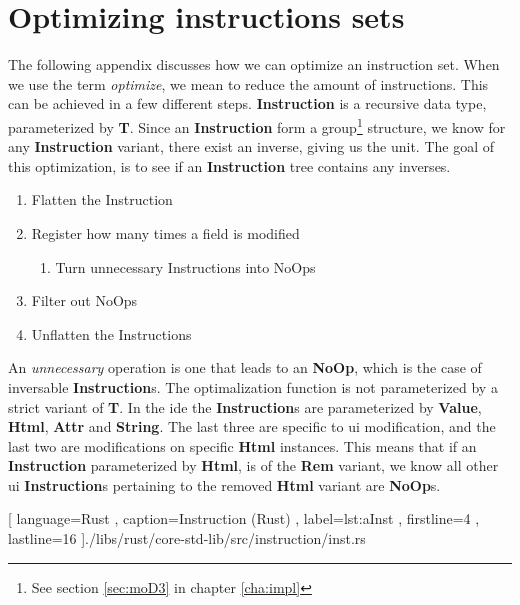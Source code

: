 \chapter{Optimizing instructions sets} \label{app:a}

The following appendix discusses how we can optimize an instruction set. When we
use the term \textit{optimize}, we mean to reduce the amount of instructions.
This can be achieved in a few different steps. \textbf{Instruction} is a
recursive data type, parameterized by \textbf{T}. Since an \textbf{Instruction}
form a group\footnote{See section \ref{sec:moD3} in chapter \ref{cha:impl}}
structure, we know for any \textbf{Instruction} variant, there exist an inverse,
giving us the unit. The goal of this optimization, is to see if an
\textbf{Instruction} tree contains any inverses.

\begin{enumerate}
  \item Flatten the Instruction
  \item Register how many times a field is modified
    \begin{enumerate}
      \item Turn unnecessary Instructions into NoOps
    \end{enumerate}
  \item Filter out NoOps
  \item Unflatten the Instructions
\end{enumerate}

An \textit{unnecessary} operation is one that leads to an \textbf{NoOp}, which
is the case of inversable \textbf{Instruction}s. The optimalization function
is not parameterized by a strict variant of \textbf{T}. In the \gls*{ide} the
\textbf{Instruction}s are parameterized by \textbf{Value}, \textbf{Html},
\textbf{Attr} and \textbf{String}. The last three are specific to \gls*{ui}
modification, and the last two are modifications on specific \textbf{Html}
instances. This means that if an \textbf{Instruction} parameterized by
\textbf{Html}, is of the \textbf{Rem} variant, we know all other \gls*{ui}
\textbf{Instruction}s pertaining to the removed \textbf{Html} variant are
\textbf{NoOp}s.

\begin{code}[H]
  
   [ language=Rust
   , caption={Instruction (Rust)}
   , label=lst:aInst
   , firstline=4
   , lastline=16
   ]{./libs/rust/core-std-lib/src/instruction/inst.rs}
\end{code}

